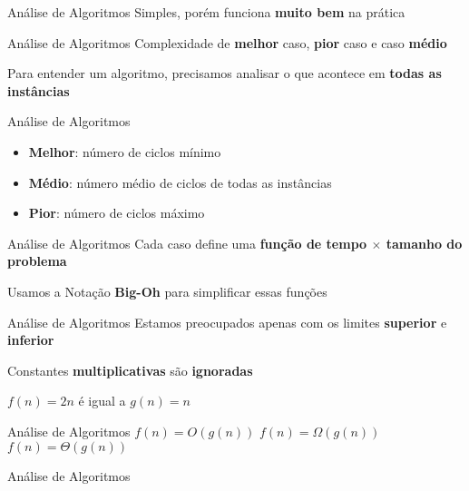 \documentclass[10pt]{beamer}
\begin{document}
\begin{frame}{Análise de Algoritmos}
  \huge Simples, porém funciona \textbf{muito bem} na prática
\end{frame}

\begin{frame}{Análise de Algoritmos}
  \huge Complexidade de \textbf{melhor} caso, \textbf{pior} caso e caso \textbf{médio}

  \vfill

  \Large Para entender um algoritmo, precisamos analisar o que acontece em \textbf{todas as instâncias}
\end{frame}

\begin{frame}{Análise de Algoritmos}
  \huge
  \begin{itemize}
    \item \textbf{Melhor}: número de ciclos mínimo
    \item \textbf{Médio}: número médio de ciclos de todas as instâncias
    \item \textbf{Pior}: número de ciclos máximo 
  \end{itemize}
\end{frame}

\begin{frame}{Análise de Algoritmos}
  \huge Cada caso define uma \textbf{função de tempo $\times$ tamanho do problema}

  \vfill

  Usamos a Notação \textbf{Big-Oh} para simplificar essas funções
\end{frame}

\begin{frame}{Análise de Algoritmos}
  \huge
  Estamos preocupados apenas com os limites \textbf{superior} e \textbf{inferior}

  Constantes \textbf{multiplicativas} são \textbf{ignoradas}

  $f(n) = 2n$ é igual a $g(n) = n$
\end{frame}

\begin{frame}{Análise de Algoritmos}
  \huge
  \centering
  $f(n) = O(g(n))$
  \vfill
  $f(n) = \Omega(g(n))$
  \vfill
  $f(n) = \Theta(g(n))$
\end{frame}

\begin{frame}{Análise de Algoritmos}
  \huge
  \centering
  \vfill
  \vfill
\end{frame}
\end{document}
